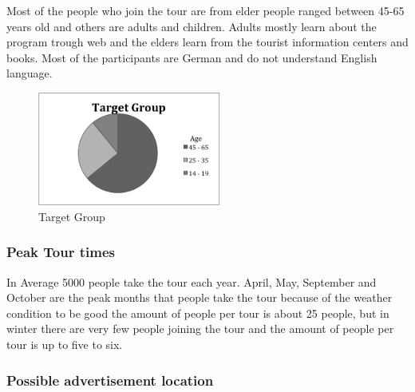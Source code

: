 Most of the people who join the tour are from elder people ranged between 45-65 years old and others are adults and children. Adults mostly learn about the program trough web and the elders learn from the tourist information centers and books.  Most of the participants are German and do not understand English language.

\begin{figure}[H]
    \centering
    \includegraphics[width=6cm]{Figures/4/target_group}%
    \caption{Target Group}%
    \label{fig:target_group}%
\end{figure}


\subsubsection{Peak Tour times}
In Average 5000 people take the tour each year. April, May, September and October are the peak months that people take the tour because of the weather condition to be good the amount of people per tour is about 25 people, but in winter there are very few people joining the tour and the amount of people per tour is up to five to six. 

\subsubsection{Possible advertisement location}

